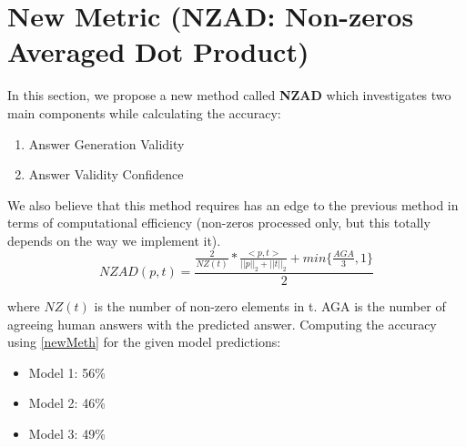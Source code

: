 \documentclass{article}
\begin{document}
\section{New Metric (NZAD: Non-zeros Averaged Dot Product)}
In this section, we propose a new method called \textbf{NZAD} which investigates two main components while calculating the accuracy:
\begin{enumerate}
    \item Answer Generation Validity
    \item Answer Validity Confidence
\end{enumerate}
We also believe that this method requires has an edge to the previous method in terms of computational efficiency (non-zeros processed only, but this totally depends on the way we implement it).
\begin{equation}
    \label{newMeth}
    NZAD(p, t) = \frac{\frac{2}{NZ(t)} * \frac{<p, t>}{||p||_2 + ||t||_2} + min\{ \frac{AGA}{3}, 1\}}{2}
\end{equation}

where $NZ(t)$ is the number of non-zero elements in t. AGA is the number of agreeing human answers with the predicted answer. Computing the accuracy using \ref{newMeth} for the given model predictions:
\begin{itemize}
    \item Model 1: 56\%
    \item Model 2: 46\%
    \item Model 3: 49\%
\end{itemize}
\end{document}
